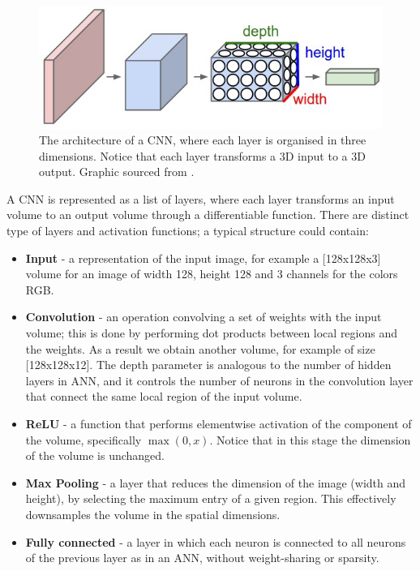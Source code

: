 \begin{figure}[htbp]
	\centering
	\includegraphics[scale=0.5]{cnn.png}
	\caption{The architecture of a CNN, where each layer is organised in three dimensions. Notice that each layer transforms a 3D input to a 3D output. Graphic sourced from \cite{CS231n}.}
	\label{CNN}
\end{figure}
\vspace{0.3cm}
A CNN is represented as a list of layers, where each layer transforms an input volume to an output volume through a differentiable function. There are distinct type of layers and activation functions; a typical structure could contain:
\begin{itemize}
	\item \textbf{Input} - a representation of the input image, for example a [128x128x3] volume for an image of width 128, height 128 and 3 channels for the colors RGB. 
	\item \textbf{Convolution} - an operation convolving a set of weights with the input volume; this is done by performing dot products between local regions and the weights. As a result we obtain another volume, for example of size [128x128x12]. The depth parameter is analogous to the number of hidden layers in ANN, and it controls the number of neurons in the convolution layer that connect the same local region of the input volume. 
	\item \textbf{ReLU} - a function that performs elementwise activation of the component of the volume, specifically $\max(0, x)$. Notice that in this stage the dimension of the volume is unchanged. 
	\item \textbf{Max Pooling} - a layer that reduces the dimension of the image (width and height), by selecting the maximum entry of a given region. This effectively downsamples the volume in the spatial dimensions.
	\item \textbf{Fully connected} - a layer in which each neuron is connected to all neurons of the previous layer as in an ANN, without weight-sharing or sparsity.
\end{itemize}


